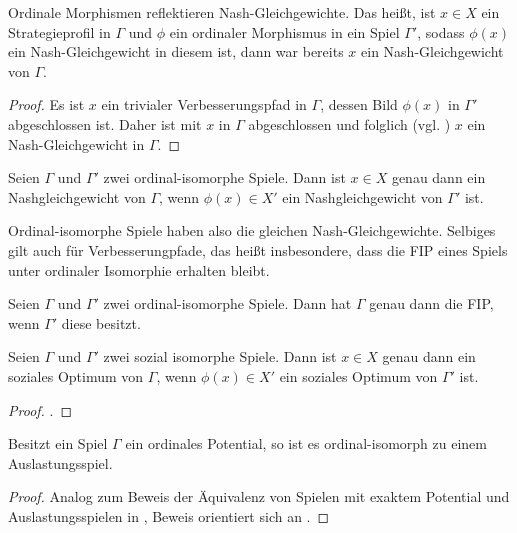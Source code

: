 \begin{kor}
	Ordinale Morphismen reflektieren Nash-Gleichgewichte. Das heißt, ist $x \in X$ ein Strategieprofil in $\Gamma$ und $\phi$ ein ordinaler Morphismus in ein Spiel $\Gamma'$, sodass $\phi(x)$ ein Nash-Gleichgewicht in diesem ist, dann war bereits $x$ ein Nash-Gleichgewicht von $\Gamma$.
\end{kor}

\begin{proof}
	Es ist $x$ ein trivialer Verbesserungspfad in $\Gamma$, dessen Bild $\phi(x)$ in $\Gamma'$ abgeschlossen ist. Daher ist mit   $x$ in $\Gamma$ abgeschlossen und folglich (vgl. ) $x$ ein Nash-Gleichgewicht in $\Gamma$.
\end{proof}

\begin{kor}
	Seien $\Gamma$ und $\Gamma'$ zwei ordinal-isomorphe Spiele. Dann ist $x \in X$ genau dann ein Nashgleichgewicht von $\Gamma$, wenn $\phi(x) \in X'$ ein Nashgleichgewicht von $\Gamma'$ ist.
\end{kor}

Ordinal-isomorphe Spiele haben also die gleichen Nash-Gleichgewichte. Selbiges gilt auch für Verbesserungpfade, das heißt insbesondere, dass die FIP eines Spiels unter ordinaler Isomorphie erhalten bleibt.

\begin{kor}
	Seien $\Gamma$ und $\Gamma'$ zwei ordinal-isomorphe Spiele. Dann hat $\Gamma$ genau dann die FIP, wenn $\Gamma'$ diese besitzt.
\end{kor}


\begin{lemma}
	Seien $\Gamma$ und $\Gamma'$ zwei sozial isomorphe Spiele. Dann ist $x \in X$ genau dann ein soziales Optimum von $\Gamma$, wenn $\phi(x) \in X'$ ein soziales Optimum von $\Gamma'$ ist.
\end{lemma}

\begin{proof}
	.
	
\end{proof}

\begin{satz}
	Besitzt ein Spiel $\Gamma$ ein ordinales Potential, so ist es ordinal-isomorph zu einem Auslastungsspiel.
\end{satz}

\begin{proof}
	Analog zum Beweis der Äquivalenz von Spielen mit exaktem Potential und Auslastungsspielen in \cite{MonShap}, Beweis orientiert sich an \cite{MultiPotGames}.
\end{proof}


